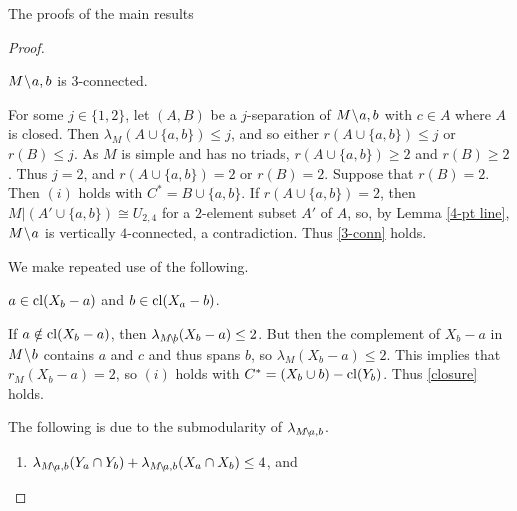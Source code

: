 \documentclass[12pt]{amsart}
\begin{document}
\begin{section}{The proofs of the main results}
\begin{proof}
\begin{claim} \label{3-conn}
$M \!\setminus\! a,b$ is $3$-connected.
\end{claim}
For some $j \in\{1,2\}$, let $(A, B)$ be a $j$-separation of $M \!\setminus\! a,b$ with $c \in A$ where $A$ is closed.
Then $\lambda_M(A \cup \{a, b\}) \le j$, and so either $r(A \cup \{a, b\}) \le j$ or $r(B) \le j$.
As $M$ is simple and has no triads, $r(A \cup \{a,b\}) \ge 2$ and $r(B) \ge 2$.
Thus $j = 2$, and $r(A \cup \{a,b\}) = 2$ or $r(B) = 2$.
Suppose that $r(B) = 2$.
Then $(i)$ holds with $C^* = B \cup \{a, b\}$.
If $r(A \cup \{a, b\}) = 2$, then $M|(A' \cup \{a,b\}) \cong U_{2,4}$ for a $2$-element subset $A'$ of $A$, so, by Lemma \ref{4-pt line}, $M \!\setminus\! a$ is vertically $4$-connected, a contradiction.
Thus \ref{3-conn} holds.


We make repeated use of the following.

\begin{claim} \label{closure}
$a \in \operatorname{cl}(X_b - a)$ and $b \in \operatorname{cl}(X_a - b)$.
\end{claim}
If $a \notin \operatorname{cl}(X_b - a)$, then $\lambda_{M\!\setminus\! b}(X_b - a) \le 2$.
But then the complement of $X_b - a$ in $M \!\setminus\! b$ contains $a$ and $c$ and thus spans $b$, so $\lambda_M(X_b - a) \le 2$.
This implies that $r_M(X_b - a) = 2$, so $(i)$ holds with $C^* = (X_b \cup b) - \operatorname{cl}(Y_b)$.
Thus \ref{closure} holds.



The following is due to the submodularity of $\lambda_{M \!\setminus\! a,b}$.

\begin{claim} \label{uncrossing}
\begin{enumerate}[$(i)$]
\item $\lambda_{M \!\setminus\! a,b}(Y_a \cap Y_b) + \lambda_{M \!\setminus\! a,b}(X_a \cap X_b) \le 4$, and


\end{enumerate}
\end{claim}
\end{proof}
\end{section}
\end{document}

